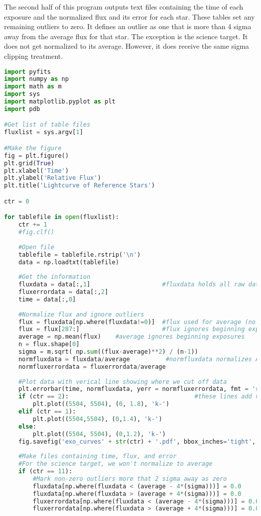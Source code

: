 \documentclass{aastex}
\begin{document}
The second half of this program outputs text files containing the time of each exposure and the normalized flux and its error for each star. These tables set any remaining outliers to zero. It defines an outlier as one that is more than 4 sigma away from the average flux for that star. The exception is the science target. It does not get normalized to its average. However, it does receive the same sigma clipping treatment.
\begin{lstlisting}[language = Python, caption = Plots the lightcurves for each star and outputs fluxes to files (YM and JM)]
import pyfits
import numpy as np
import math as m
import sys
import matplotlib.pyplot as plt
import pdb

#Get list of table files
fluxlist = sys.argv[1]

#Make the figure
fig = plt.figure()
plt.grid(True)
plt.xlabel('Time')
plt.ylabel('Relative Flux')
plt.title('Lightcurve of Reference Stars')

ctr = 0

for tablefile in open(fluxlist):
	ctr += 1
	#fig.clf()
	
	#Open file
	tablefile = tablefile.rstrip('\n')
	data = np.loadtxt(tablefile)
	
	#Get the information
	fluxdata = data[:,1]                    #fluxdata holds all raw data
	fluxerrordata = data[:,2]
	time = data[:,0]
	
	#Normalize flux and ignore outliers
	flux = fluxdata[np.where(fluxdata!=0)]  #flux used for average (no outliers)
	flux = flux[287:]                       #flux ignores beginning exposures
	average = np.mean(flux)    #average ignores beginning exposures
	n = flux.shape[0]
	sigma = m.sqrt( np.sum((flux-average)**2) / (n-1))
	normfluxdata = fluxdata/average          #normfluxdata normalizes ALL exposures
	normfluxerrordata = fluxerrordata/average
	
	#Plot data with verical line showing where we cut off data
	plt.errorbar(time, normfluxdata, yerr = normfluxerrordata, fmt = 'r.')
	if (ctr == 2):                                   #these lines add vertical lines
		plt.plot((5504, 5504), (0, 1.8), 'k-')
	elif (ctr == 1):
		plt.plot((5504,5504), (0,1.4), 'k-')
	else:
		plt.plot((5504, 5504), (0,1.2), 'k-') 
	fig.savefig('exo_curves' + str(ctr) + '.pdf', bbox_inches='tight', dpi=fig.dpi)	
	
	#Make files containing time, flux, and error
	#For the science target, we won't normalize to average
	if (ctr == 11):
		#Mark non-zero outliers more that 2 sigma away as zero
		fluxdata[np.where(fluxdata < (average - 4*(sigma)))] = 0.0
		fluxdata[np.where(fluxdata > (average + 4*(sigma)))] = 0.0
		fluxerrordata[np.where(fluxdata < (average - 4*(sigma)))] = 0.0
		fluxerrordata[np.where(fluxdata > (average + 4*(sigma)))] = 0.0
	

\end{lstlisting}
\end{document}
